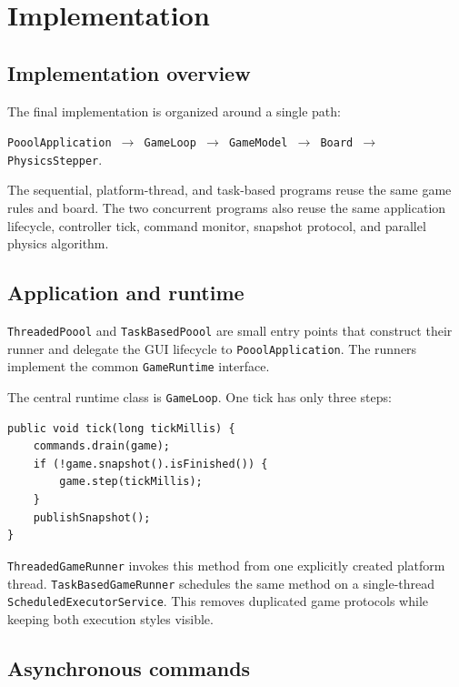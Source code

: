 \clearpage
\section{Implementation}

\subsection{Implementation overview}

The final implementation is organized around a single path:

\begin{center}
\texttt{PooolApplication $\rightarrow$ GameLoop $\rightarrow$ GameModel $\rightarrow$ Board $\rightarrow$ PhysicsStepper}.
\end{center}

The sequential, platform-thread, and task-based programs reuse the same game rules and board.
The two concurrent programs also reuse the same application lifecycle, controller tick, command monitor, snapshot protocol, and parallel physics algorithm.

\subsection{Application and runtime}

\texttt{ThreadedPoool} and \texttt{TaskBasedPoool} are small entry points that construct their runner and delegate the GUI lifecycle to \texttt{PooolApplication}.
The runners implement the common \texttt{GameRuntime} interface.

The central runtime class is \texttt{GameLoop}.
One tick has only three steps:

\begin{lstlisting}[style=codestyle,caption={Shared single-writer game tick},label={lst:shared-game-loop}]
public void tick(long tickMillis) {
    commands.drain(game);
    if (!game.snapshot().isFinished()) {
        game.step(tickMillis);
    }
    publishSnapshot();
}
\end{lstlisting}

\texttt{ThreadedGameRunner} invokes this method from one explicitly created platform thread.
\texttt{TaskBasedGameRunner} schedules the same method on a single-thread \texttt{ScheduledExecutorService}.
This removes duplicated game protocols while keeping both execution styles visible.

\subsection{Asynchronous commands}

